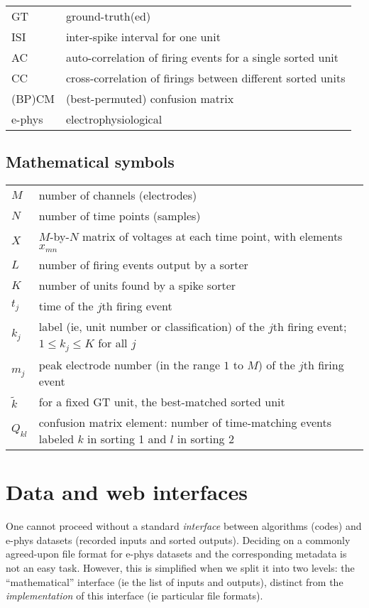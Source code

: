 \documentclass[10pt]{article}
\begin{document}
\begin{tabular}{ll}
  GT & ground-truth(ed)\\
  ISI & inter-spike interval for one unit\\
AC & auto-correlation of firing events for a single sorted unit\\
CC & cross-correlation of firings between different sorted units\\
(BP)CM & (best-permuted) confusion matrix \cite{validspike}\\
e-phys & electrophysiological\\
\end{tabular}


\subsection{Mathematical symbols}
\label{s:symb}

\begin{tabular}{ll}
  $M$ & number of channels (electrodes)\\
  $N$ & number of time points (samples)\\
  $X$ & $M$-by-$N$ matrix of voltages at each time point, with elements $x_{mn}$\\
  $L$ & number of firing events output by a sorter\\
  $K$ & number of units found by a spike sorter\\
  $t_j$ & time of the $j$th firing event\\
  $k_j$ & label (ie, unit number or classification) of the $j$th firing event;
  $1\le k_j \le K$ for all $j$\\
  $m_j$ & peak electrode number (in the range $1$ to $M$) of the $j$th firing event\\
  $\tilde k$ & for a fixed GT unit, the best-matched sorted unit\\
  $Q_{kl}$ & confusion matrix element:
  number of time-matching events labeled $k$ in sorting 1 and $l$ in sorting 2\\
\end{tabular}


\section{Data and web interfaces}

One cannot proceed without a
standard {\em interface} between algorithms (codes) and e-phys datasets
(recorded inputs and sorted outputs).
Deciding on a commonly agreed-upon file format for e-phys datasets and the corresponding metadata is not an easy task.
However, this is simplified when we split it into two levels:
the ``mathematical'' interface
(ie the list of inputs and outputs), distinct from the
{\em implementation} of this interface (ie particular file formats).
\end{document}
